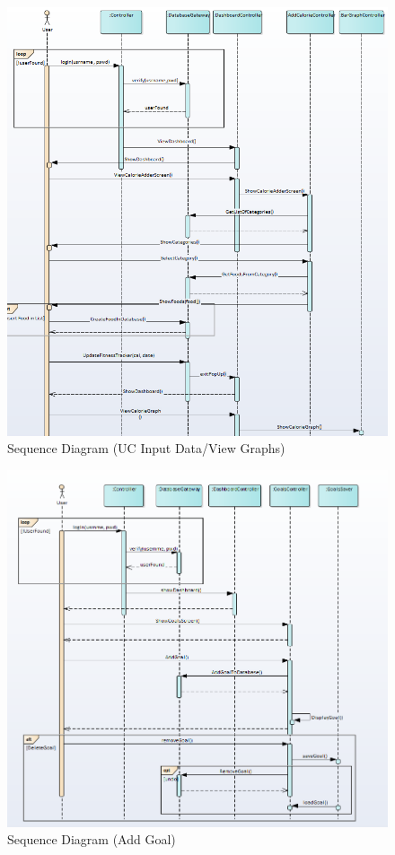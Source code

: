 \documentclass[10pt]{article}
\begin{document}
\begin{figure}[h!]
	\begin{center}
		\includegraphics[width=\columnwidth]{UC3.png}
		\caption{{Sequence Diagram (UC Input Data/View Graphs)
				{\label{div-885174}}%
		}}
	\end{center}
\end{figure}


\begin{figure}[h!]
	\begin{center}
		\includegraphics[width=\columnwidth]{UC4.png}
		\caption{{Sequence Diagram (Add Goal)
				{\label{div-291050}}%
		}}
	\end{center}
\end{figure}
\end{document}
